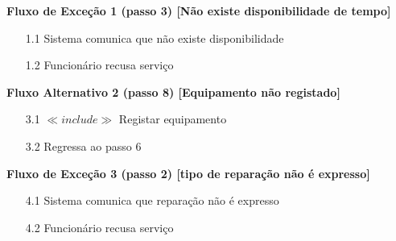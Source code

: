 \documentclass[../relatorio.tex]{subfiles}
\begin{document}
\begin{itemize}
          \begin{flushleft}
              \textbf{Fluxo de Exceção 1 (passo 3) [Não existe disponibilidade de tempo]}
          \end{flushleft}
          \begin{itemize}
              \item[1.1]{Sistema comunica que não existe disponibilidade}
              \item[1.2]{Funcionário recusa serviço}
          \end{itemize}
          \begin{flushleft}
              \textbf{Fluxo Alternativo 2 (passo 8) [Equipamento não registado]}
          \end{flushleft}
          \begin{itemize}
              \item[3.1] $\ll include \gg$ Registar equipamento
              \item[3.2] Regressa ao passo 6
          \end{itemize}
          \begin{flushleft}
              \textbf{Fluxo de Exceção 3 (passo 2) [tipo de reparação não é expresso]}
          \end{flushleft}
          \begin{itemize}
              \item[4.1]{Sistema comunica que reparação não é expresso}
              \item[4.2]{Funcionário recusa serviço}
          \end{itemize}
\end{itemize}
\end{document}
